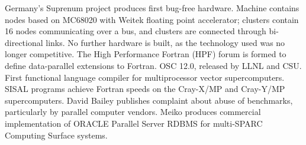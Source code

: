 	{Germany's Suprenum project produces first bug-free hardware.
	Machine contains nodes based on MC68020 with Weitek
	floating point accelerator;
	clusters contain 16 nodes communicating over a bus,
	and clusters are connected through bi-directional links.
	No further hardware is built,
	as the technology used was no longer competitive.}
	{The High Performance Fortran (HPF) forum is formed to define
	data-parallel extensions to Fortran.}
	{OSC 12.0, released by LLNL and CSU.
	First functional language compiler for
	multiprocessor vector supercomputers.
	SISAL programs achieve Fortran speeds on the Cray-X/MP
	and Cray-Y/MP supercomputers.}
	{David Bailey publishes complaint about abuse of benchmarks,
	particularly by parallel computer vendors.}
	{Meiko produces commercial implementation of ORACLE Parallel Server
	RDBMS for multi-SPARC Computing Surface systems.}

